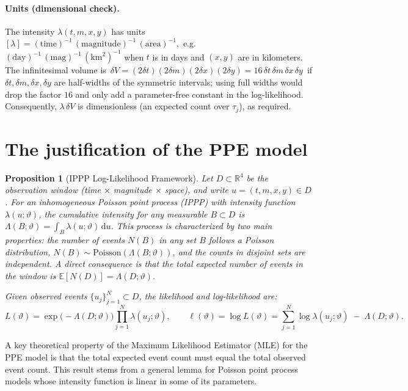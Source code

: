 \documentclass[linenum,doublespace,onecolumn]{SSA-SRL}
\theoremstyle{lemma}
\newtheorem{proposition}{Proposition}
\begin{document}
\paragraph{Units (dimensional check).} \quad
The intensity $\lambda(t,m,x,y)$ has units$ [\lambda]=(\text{time})^{-1}\,(\text{magnitude})^{-1}\,(\text{area})^{-1},$
e.g.\ $(\mathrm{day})^{-1}\,(\mathrm{mag})^{-1}\,(\mathrm{km}^2)^{-1}$ when $t$ is in days and $(x,y)$ are in kilometers. 
The infinitesimal volume is $\,\delta V=(2\delta t)(2\delta m)(2\delta x)(2\delta y)=16\,\delta t\,\delta m\,\delta x\,\delta y\,$ if $\delta t,\delta m,\delta x,\delta y$ are half-widths of the symmetric intervals; using full widths would drop the factor $16$ and only add a parameter-free constant in the log-likelihood. 
Consequently, $\lambda\,\delta V$ is dimensionless (an expected count over $\tau_j$), as required. 


\section{The justification of the PPE model} \label{sec:derive_ppe}

\begin{proposition}[IPPP Log-Likelihood Framework]
Let $D\subset\mathbb{R}^4$ be the observation window (time $\times$ magnitude $\times$ space), and write $u=(t,m,x,y)\in D$. For an inhomogeneous Poisson point process (IPPP) with intensity function $\lambda(u;\vartheta)$, the cumulative intensity for any measurable $B\subset D$ is $\Lambda(B;\vartheta)=\int_{B}\lambda(u;\vartheta)\,\mathrm{d}u$.
This process is characterized by two main properties: the number of events $N(B)$ in any set $B$ follows a Poisson distribution, $N(B)\sim \mathrm{Poisson}(\Lambda(B;\vartheta))$, and the counts in disjoint sets are independent. A direct consequence is that the total expected number of events in the window is $\mathbb{E}[N(D)]=\Lambda(D;\vartheta)$.

Given observed events $\{u_j\}_{j=1}^N\subset D$, the likelihood and log-likelihood are:
\[
L(\vartheta)
= \exp\!\big(-\Lambda(D;\vartheta)\big)\prod_{j=1}^N \lambda(u_j;\vartheta),
\qquad
\ell(\vartheta)=\log L(\vartheta)
= \sum_{j=1}^N \log \lambda(u_j;\vartheta)\;-\;\Lambda(D;\vartheta).
\]
\end{proposition}

A key theoretical property of the Maximum Likelihood Estimator (MLE) for the PPE model is that the total expected event count must equal the total observed event count. This result stems from a general lemma for Poisson point process models whose intensity function is linear in some of its parameters.
\end{document}
